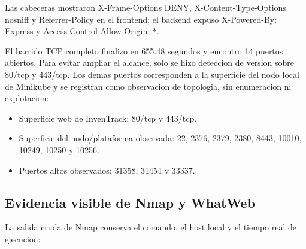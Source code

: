 Las cabeceras mostraron X-Frame-Options DENY, X-Content-Type-Options nosniff y Referrer-Policy en el frontend; el backend expuso X-Powered-By: Express y Access-Control-Allow-Origin: *.

El barrido TCP completo finalizo en 655.48 segundos y encontro 14 puertos abiertos. Para evitar ampliar el alcance, solo se hizo deteccion de version sobre 80/tcp y 443/tcp. Los demas puertos corresponden a la superficie del nodo local de Minikube y se registran como observacion de topologia, sin enumeracion ni explotacion:

\begin{itemize}
\tightlist
\item
  Superficie web de InvenTrack: 80/tcp y 443/tcp.
\item
  Superficie del nodo/plataforma observada: 22, 2376, 2379, 2380, 8443, 10010, 10249, 10250 y 10256.
\item
  Puertos altos observados: 31358, 31454 y 33337.
\end{itemize}

\subsection{Evidencia visible de Nmap y WhatWeb}\label{evidencia-visible-de-nmap-y-whatweb}

La salida cruda de Nmap conserva el comando, el host local y el tiempo real de ejecucion:

